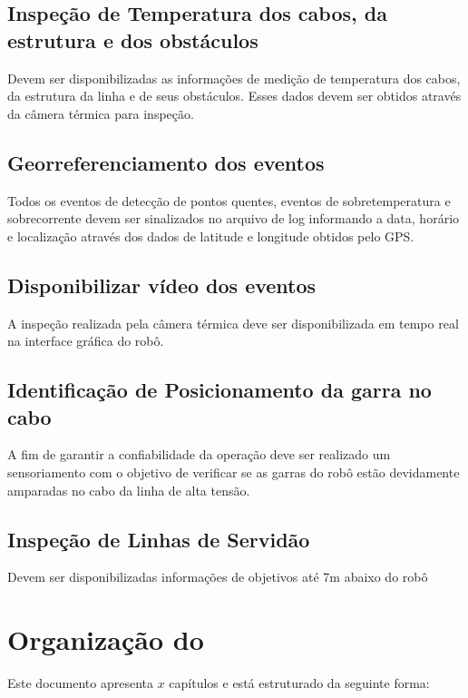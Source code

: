     \subsection{Inspeção de Temperatura dos cabos, da estrutura e dos obstáculos} 
    Devem ser disponibilizadas as informações de medição de temperatura dos cabos, da estrutura da linha e de seus obstáculos. Esses dados devem ser obtidos através da câmera térmica para inspeção.    \subsection{Georreferenciamento dos eventos}
    Todos os eventos de detecção de pontos quentes, eventos de sobretemperatura e sobrecorrente devem ser sinalizados no arquivo de log informando a data, horário e localização através dos dados de latitude e longitude obtidos pelo GPS.
    \subsection{Disponibilizar vídeo dos eventos} 
    A inspeção realizada pela câmera térmica deve ser disponibilizada em tempo real na interface gráfica do robô.
    \subsection{Identificação de Posicionamento da garra no cabo} 
    A fim de garantir a confiabilidade da operação deve ser realizado um sensoriamento com o objetivo de verificar se as garras do robô estão devidamente amparadas no cabo da linha de alta tensão.
    \subsection{Inspeção de Linhas de Servidão}  
    Devem ser disponibilizadas informações de objetivos até 7m abaixo do robô
\section{Organização do \thetypework}
\label{section:organizacao}

Este documento apresenta $x$ capítulos e está estruturado da seguinte forma:

